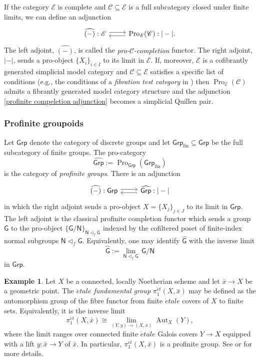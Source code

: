 \documentclass{amsart}
\newcommand{\bE}{\mathscr{E}}
\newcommand{\Gr}{\mathsf{Grp}}
\newcommand{\Pro}{\operatorname{Pro}}
\newcommand{\Aut}{\operatorname{Aut}}
\theoremstyle{definition}
\newtheorem{example}[theorem]{Example}%
\numberwithin{equation}{section}
\begin{document}
If the category $\bE$ is complete and $\mathscr{C}\subseteq\bE$ is a full subcategory closed under finite limits, we can define an adjunction \begin{equation}\label{profinite compeletion adjunction}
\begin{tikzcd} \widehat{(-)}:\bE\arrow[r, shift left =1] & \arrow[l, shift left =1] \Pro_{\bE}(\mathscr{C}): |-|. \end{tikzcd}
\end{equation} The left adjoint, $\widehat{(-)}$, is called the \emph{pro-$\mathscr{C}$-completion} functor. The right adjoint, $|-|$, sends a pro-object $\{X_i\}_{i\in I}$ to its limit in $\mathscr{E}$.  If, moreover, $\bE$ is a cofibrantly generated simplicial model category and $\mathscr{C}\subseteq \bE$ satisfies a specific list of conditions (e.g., the conditions of a \emph{fibration test category} in \cite[Definition 5.1]{BM20}) then $\Pro_{\bE}(\mathscr{C})$ admits a fibrantly generated model category structure and the adjunction \eqref{profinite compeletion adjunction} becomes a simplicial Quillen pair. 

\subsubsection{Profinite groupoids}
Let $\Gr$ denote the category of discrete groups and let $\Gr_{\mathrm{fin}}\subseteq \Gr$ be the full subcategory of finite groups. The pro-category
\[
\widehat{\Gr}:=\Pro_{\Gr}(\Gr_{\mathrm{fin}})
\] is the category of \emph{profinite groups}. There is an adjunction
\[
\begin{tikzcd}
\widehat{(-)}:\Gr \arrow[r, shift left=1] & \arrow[l, shift left=1] \widehat{\Gr}:|-|
\end{tikzcd}
\]
in which the right adjoint sends a pro-object $X=\{X_j\}_{j\in J}$ to its limit in $\Gr$.
The left adjoint is the classical profinite completion functor which sends a group $\mathsf G$ to the pro-object $\{\mathsf G/\mathsf N\}_{\mathsf N\triangleleft_f \mathsf G}$ indexed by the cofiltered poset of finite-index normal subgroups $\mathsf N\triangleleft_f \mathsf G$. Equivalently, one may identify $\widehat{\mathsf G}$ with the inverse limit
\[
\widehat{\mathsf G}:= \lim_{\mathsf N\triangleleft_f \mathsf G}\,\mathsf G/\mathsf N
\]
in $\Gr$.

\begin{example}\label{example: etale fundamental groups}
Let $X$ be a connected, locally Noetherian scheme and let
$\bar{x}\to X$ be a geometric point.  The \emph{$\acute etale$
fundamental group} $\pi_1^{\acute et}(X,\bar{x})$ may be defined as the
automorphism group of the fibre functor from finite $\acute etale$ covers of
$X$ to finite sets.  Equivalently, it is the inverse limit
\[
\pi_1^{\acute et}(X,\bar{x})
\cong
\lim_{(Y,y)\to (X,\bar{x})}\Aut_X(Y),
\]
where the limit ranges over connected finite $\acute etale$ Galois covers
$Y\to X$ equipped with a lift $y:\bar{x}\to Y$ of $\bar{x}$.  In
particular, $\pi_1^{\acute et}(X,\bar{x})$ is a profinite group. See \cite[\href{https://stacks.math.columbia.edu/tag/0BQ8}{0BQ8}]{stacks-project} or \cite[Expos\'e V]{grothendieck2003revetements} for more details. 
\end{example}
\end{document}
